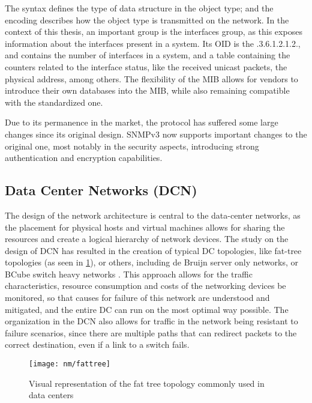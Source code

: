 \par The syntax defines the type of data structure in the object type; and the encoding describes how the object type is transmitted on the network. In the context
of this thesis, an important group is the interfaces group, as this exposes information about the interfaces present in a system. Its OID is the .3.6.1.2.1.2., 
and contains the number of interfaces in a system, and a table containing the counters related to the interface status, like the received unicast packets, the 
physical address, among others. The flexibility of the MIB allows for vendors to introduce their own databases into the MIB, while also remaining compatible 
with the standardized one.

\par Due to its permanence in the market, the protocol has suffered some large changes since its original design. SNMPv3 now supports important changes to the
original one, most notably in the security aspects, introducing strong authentication and encryption capabilities.

\subsection {Data Center Networks (DCN)}

\par The design of the network architecture is central to the data-center networks, as the placement for physical hosts and virtual machines allows for sharing the 
resources and create a logical hierarchy of network devices. The study on the design of DCN has resulted in the creation of typical DC topologies, like fat-tree
topologies (as seen in \ref{fig:fattree}), or others, including de Bruijn server only networks, or BCube switch heavy networks \cite{popa_cost_2010}. This approach
allows for the traffic characteristics, resource consumption and costs of the networking devices be monitored, so that causes for failure of this network are
understood and mitigated, and the entire DC can run on the most optimal way possible. The organization in the DCN also allows for traffic in the network being
resistant to failure scenarios, since there are multiple paths that can redirect packets to the correct destination, even if a link to a switch fails.

\begin{figure} [!htbp]
    \centering
    \texttt{[image: nm/fattree]}
    \caption{Visual representation of the fat tree topology commonly used in data centers}
    \label{fig:fattree}
\end{figure}


